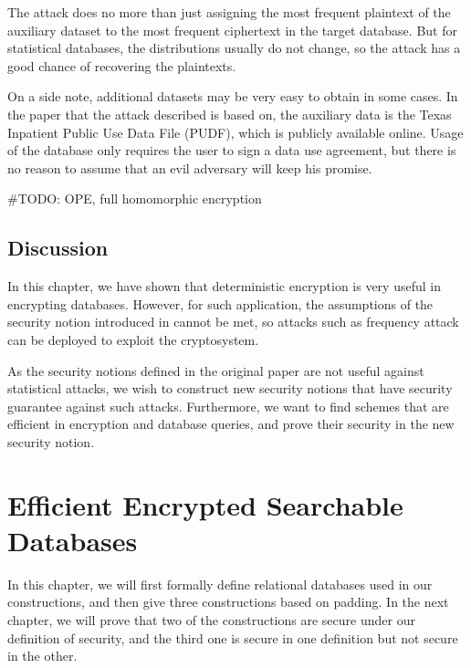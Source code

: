 \documentclass[10pt]{book}
\begin{document}
\begin{center}
\end{center}

The attack does no more than just assigning the most frequent plaintext of the auxiliary dataset to the most frequent ciphertext in the target database. But for statistical databases, the distributions usually do not change, so the attack has a good chance of recovering the plaintexts.

On a side note, additional datasets may be very easy to obtain in some cases. In the paper that the attack described is based on, the auxiliary data is the Texas Inpatient Public Use Data File (PUDF), which is publicly available online. Usage of the database only requires the user to sign a data use agreement, but there is no reason to assume that an evil adversary will keep his promise.


\#TODO: OPE, full homomorphic encryption

\section{Discussion}
In this chapter, we have shown that deterministic encryption is very useful in encrypting databases. However, for such application, the assumptions of the security notion introduced in \cite{Bellare2007, Boldyreva2008, Bellare2008} cannot be met, so attacks such as frequency attack \cite{Naveed:2015:IAP:2810103.2813651} can be deployed to exploit the cryptosystem.

As the security notions defined in the original paper are not useful against statistical attacks, we wish to construct new security notions that have security guarantee against such attacks. Furthermore, we want to find schemes that are efficient in encryption and database queries, and prove their security in the new security notion. 




\chapter{Efficient Encrypted Searchable Databases}
In this chapter, we will first formally define relational databases used in our constructions, and then give three constructions based on padding. In the next chapter, we will prove that two of the constructions are secure under our definition of security, and the third one is secure in one definition but not secure in the other.
\end{document}
